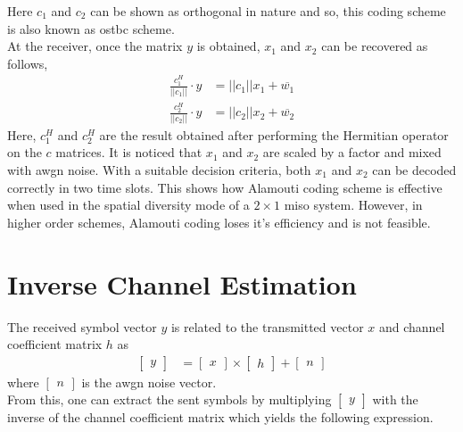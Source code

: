Here $c_1$ and $c_2$ can be shown as orthogonal in nature and so, this coding scheme is also known as \acrlong{ostbc} scheme.\\
At the receiver, once the matrix $y$ is obtained, $x_1$ and $x_2$ can be recovered as follows,
\begin{align}
\frac{c_1^H}{||c_1||} \cdot y &= ||c_1||x_1 + \overline{w_1}\\
\frac{c_2^H}{||c_2||} \cdot y &= ||c_2||x_2 + \overline{w_2}
\end{align}
Here, $c_1^H$ and $c_2^H$ are the result obtained after performing the Hermitian operator on the $c$ matrices. It is noticed that $x_1$ and $x_2$ are scaled by a factor and mixed with \acrshort{awgn} noise. With a suitable decision criteria, both $x_1$ and $x_2$ can be decoded correctly in two time slots. This shows how Alamouti coding scheme is effective when used in the \gls{spatial diversity} mode of a $2 \times 1$ \acrshort{miso} system. However, in higher order schemes, Alamouti coding loses it's efficiency and is not feasible.

\section{Inverse Channel Estimation}
The received symbol vector $y$ is related to the transmitted vector $x$ and channel coefficient matrix $h$ as\\
\begin{align}
\begin{bmatrix}
y
\end{bmatrix}
&=
\begin{bmatrix}
x
\end{bmatrix}
\times
\begin{bmatrix}
h
\end{bmatrix}
+
\begin{bmatrix}
n
\end{bmatrix}
\end{align}
where $\begin{bmatrix} n \end{bmatrix}$ is the \acrshort{awgn} noise vector.\\
From this, one can extract the sent symbols by multiplying $\begin{bmatrix} y \end{bmatrix}$ with the inverse of the channel coefficient matrix which yields the following expression.

